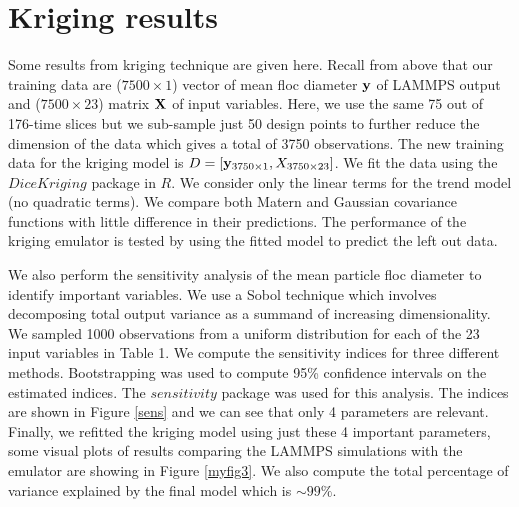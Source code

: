 \documentclass[12pt,titlepage]{report}
\newcommand{\bX}{{\bf X}}
\newcommand{\by}{{\bf y}}
\theoremstyle{definition}
\theoremstyle{remark}
\begin{document}
\section{Kriging results}
Some results from kriging technique are given here. Recall from above that our training data are ($7500 \times 1$) vector of mean floc diameter $\by$ of LAMMPS output and ($7500 \times 23$) matrix $\bX$ of input variables. Here, we use the same 75 out of 176-time slices but we sub-sample just 50 design points to further reduce the dimension of the data which gives a total of 3750 observations. The new training data for the kriging model is $D=[\by_{3750 \times 1}, X_{3750 \times 23}]$. We fit the data using the $DiceKriging$ package in $R$. We consider only the linear terms for the trend model (no quadratic terms). We compare both Matern and Gaussian covariance functions with little difference in their predictions. The performance of the kriging emulator is tested by using the fitted model to predict the left out data. 

We also perform the sensitivity analysis of the mean particle floc diameter to identify important variables. We use a Sobol technique which involves decomposing total output variance as a summand of increasing dimensionality. We sampled 1000 observations from a uniform distribution for each of the 23 input variables in Table 1. We compute the sensitivity indices for three different methods. Bootstrapping was used to compute 95\% confidence intervals on the estimated indices.  The $sensitivity$ package was used for this analysis. The indices are shown in Figure \ref{sens} and we can see that only 4 parameters are relevant. Finally, we refitted the kriging model using just these 4 important parameters, some visual plots of results comparing the LAMMPS simulations with the emulator are showing in Figure \ref{myfig3}. We also compute the total percentage of variance explained by the final model which is $\sim 99\%$.
\end{document}
